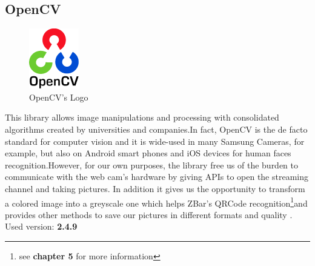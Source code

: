\subsection{OpenCV}
\begin{figure}[hbt]
    \centering
    \includegraphics[scale=0.5]{img/opencv.png}
    \caption{OpenCV's Logo}
\end{figure}
This library allows image manipulations and processing with consolidated algorithms created by universities and companies.In fact, OpenCV is the de facto standard for computer vision and it is wide-used in many Samsung Cameras, for example, but also on Android smart phones and iOS devices for human faces recognition.However, for our own purposes, the library free us of the burden to communicate with the web cam's hardware by giving APIs to open the streaming channel and taking pictures. In addition it gives us the opportunity to transform a colored image into a greyscale one which helps ZBar's QRCode recognition\footnote{see \textbf{chapter 5} for more information}and provides other methods to save our pictures in different formats and quality . 
\newline Used version: \textbf{2.4.9}

